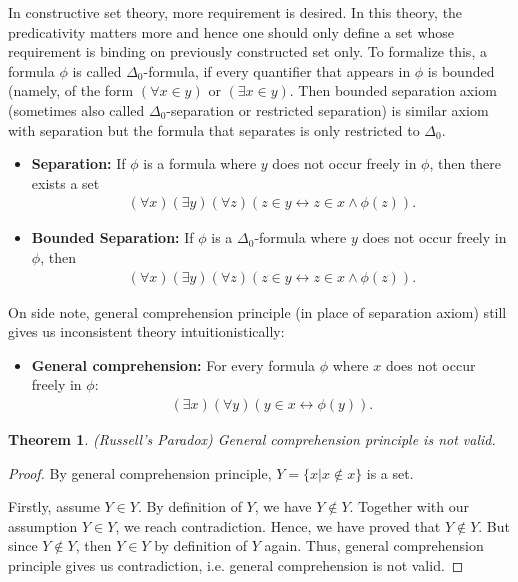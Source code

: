 \documentclass[12pt, a4paper]{article}
\theoremstyle{definition}
\theoremstyle{plain}
\newtheorem{theorem}{Theorem}
\begin{document}
In constructive set theory, more requirement is desired.
In this theory, the predicativity matters more and hence one should only define a set whose requirement is binding on previously constructed set only.
To formalize this, a formula $\phi$ is called $\Delta_0$-formula, if every quantifier that appears in $\phi$ is bounded (namely, of the form $(\forall x \in y)$ or $(\exists x \in y)$.
Then bounded separation axiom (sometimes also called $\Delta_0$-separation or restricted separation) is similar axiom with separation but the formula that separates is only restricted to $\Delta_0$.
\begin{itemize}
\item {\bf Separation:} If $\phi$ is a formula where $y$ does not occur freely in $\phi$, then there exists a set
\begin{align*}
(\forall x)(\exists y)(\forall z)(z \in y \leftrightarrow z \in x \wedge \phi(z)).
\end{align*}
\item {\bf Bounded Separation:} If $\phi$ is a $\Delta_0$-formula where $y$ does not occur freely in $\phi$, then 
\begin{align*}
(\forall x)(\exists y)(\forall z)(z \in y \leftrightarrow z \in x \wedge \phi(z)).
\end{align*}
\end{itemize}

On side note, general comprehension principle (in place of separation axiom) still gives us inconsistent theory intuitionistically:
\begin{itemize}
\item {\bf General comprehension:} For every formula $\phi$ where $x$ does not occur freely in $\phi$:
\begin{align*}
(\exists x)(\forall y)(y \in x \leftrightarrow \phi(y)).
\end{align*}
\end{itemize}
\begin{theorem}
(Russell's Paradox)
General comprehension principle is not valid.
\end{theorem}
\begin{proof}
By general comprehension principle, $Y=\{x|x \notin x\}$ is a set.

Firstly, assume $Y \in Y$. 
By definition of $Y$, we have $Y \notin Y$.
Together with our assumption $Y \in Y$, we reach contradiction.
Hence, we have proved that $Y \notin Y$.
But since $Y \notin Y$, then $Y \in Y$ by definition of $Y$ again.
Thus, general comprehension principle gives us contradiction, i.e. general comprehension is not valid.
\end{proof}
\end{document}
